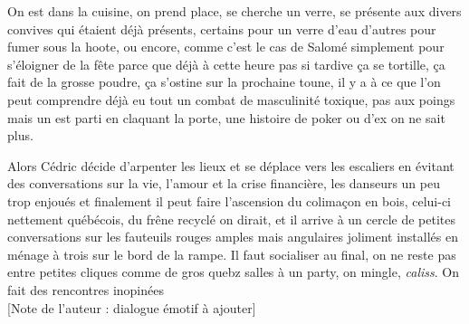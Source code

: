 On est dans la cuisine, on prend place, se cherche un verre, se présente
aux divers convives qui étaient déjà présents, certains pour un verre d'eau
d'autres pour fumer sous la hoote, ou encore, comme c'est le cas de Salomé
simplement pour s'éloigner de la fête parce que déjà à cette heure pas si
tardive  ça se tortille, ça fait de la grosse poudre, ça s'ostine sur la
prochaine toune, il y a à ce que l'on peut comprendre déjà eu tout 
un combat de masculinité toxique, pas aux poings mais un est parti en claquant
la porte, une histoire de poker ou d'ex on ne sait plus. 

Alors Cédric décide d'arpenter les lieux et se déplace vers les escaliers 
en évitant des conversations sur la vie, l'amour et la crise financière,
les danseurs un peu trop enjoués et finalement il peut faire l'ascension du 
colimaçon en bois, celui-ci nettement québécois, du frêne recyclé on dirait,
et il arrive à un cercle de petites conversations sur les fauteuils rouges
amples mais angulaires joliment installés en ménage à trois sur le
bord de la rampe. Il faut socialiser au final,
on ne reste pas entre petites cliques comme de gros quebz salles à un party, on
mingle, \emph{caliss}. On fait des
rencontres inopinées
\\

[Note de l'auteur : dialogue émotif à ajouter]\\[1em]

